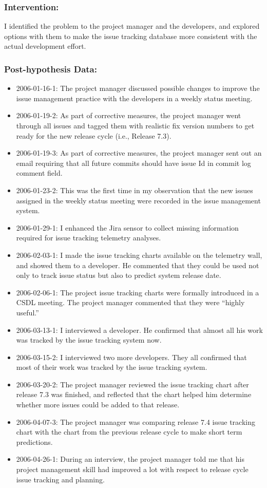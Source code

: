 \subsubsection{Intervention:}
I identified the problem to the project manager and the developers, and explored options with them to make the issue tracking database more consistent with the actual development effort.

\subsubsection{Post-hypothesis Data:}
\begin{itemize}
  \setlength{\itemsep}{0pt}
  \setlength{\parskip}{0pt}
	\item 2006-01-16-1: The project manager discussed possible changes to improve the issue management practice with the developers in a weekly status meeting.
	\item 2006-01-19-2: As part of corrective measures, the project manager went through all issues and tagged them with realistic fix version numbers to get ready for the new release cycle (i.e., Release 7.3).
	\item 2006-01-19-3: As part of corrective measures, the project manager sent out an email requiring that all future commits should have issue Id in commit log comment field.
	\item 2006-01-23-2: This was the first time in my observation that the new issues assigned in the weekly status meeting were recorded in the issue management system.
	\item 2006-01-29-1: I enhanced the Jira sensor to collect missing information required for issue tracking telemetry analyses.
	\item 2006-02-03-1: I made the issue tracking charts available on the telemetry wall, and showed them to a developer. He commented that they could be used not only to track issue status but also to predict system release date.
	\item 2006-02-06-1: The project issue tracking charts were formally introduced in a CSDL meeting. The project manager commented that they were ``highly useful.''
  \item 2006-03-13-1: I interviewed a developer. He confirmed that almost all his work was tracked by the issue tracking system now.  
  \item 2006-03-15-2: I interviewed two more developers. They all confirmed that most of their work was tracked by the issue tracking system.
	\item 2006-03-20-2: The project manager reviewed the issue tracking chart after release 7.3 was finished, and reflected that the chart helped him determine whether more issues could be added to that release. 
  \item 2006-04-07-3: The project manager was comparing release 7.4 issue tracking chart with the chart from the previous release cycle to make short term predictions.
  \item 2006-04-26-1: During an interview, the project manager told me that his project management skill had improved a lot with respect to release cycle issue tracking and planning.
\end{itemize}

